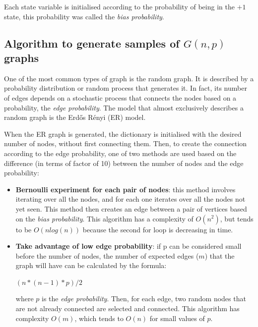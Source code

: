 \documentclass[conference]{IEEEtran}
\begin{document}
        Each state variable is initialised according to the probability of being in the $+1$ state, this probability was called the \textit{bias probability}. 

    \subsection{Algorithm to generate samples of $G(n,p)$ graphs}
    
        One of the most common types of graph is the random graph. 
        It is described by a probability distribution or random process that generates it. 
        In fact, its number of edges depends on a stochastic process that connects the nodes based on a probability, the \textit{edge probability}. 
        The model that almost exclusively describes a random graph is the Erdős Rényi (ER) model. 

        When the ER graph is generated, the dictionary is initialised with the desired number of nodes, without first connecting them. 
        Then, to create the connection according to the edge probability, one of two methods are used based on the difference (in terms of factor of 10) between the number of nodes and the edge probability:
        \begin{itemize}
            \item \textbf{Bernoulli experiment for each pair of nodes}: this method involves iterating over all the nodes, and for each one iterates over all the nodes not yet seen. 
            This method then creates an edge between a pair of vertices based on the \textit{bias probability}.
            This algorithm has a complexity of $O(n^2)$, but tends to be $O(nlog(n))$ because the second for loop is decreasing in time.

            \item \textbf{Take advantage of low edge probability}: if p can be considered small before the number of nodes, the number of expected edges ($m$) that the graph will have can be calculated by the formula:
            \begin{center}
                \begin{math}
                    (n*(n-1)*p)/2 
                \end{math}            
            \end{center}        
            where $p$ is the \textit{edge probability}. 
            Then, for each edge, two random nodes that are not already connected are selected and connected.
            This algorithm has complexity $O(m)$, which tends to $O(n)$ for small values of $p$.
        \end{itemize}
\end{document}
